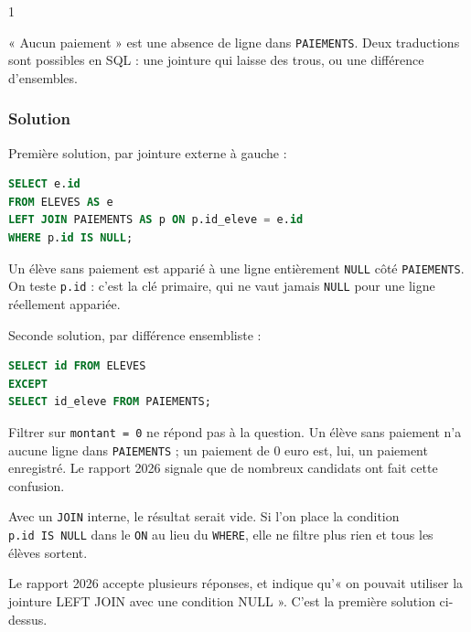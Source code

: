 \documentclass[11pt,a4paper]{article}
\begin{document}
\begin{indication}{1}

« Aucun paiement » est une absence de ligne dans \texttt{PAIEMENTS}. Deux traductions sont possibles en SQL : une jointure qui laisse des trous, ou une différence d'ensembles.

\end{indication}

\hypertarget{solution-3}{%
\subsubsection{Solution}\label{solution-3}}

Première solution, par jointure externe à gauche :

\begin{lstlisting}[language=SQL]
SELECT e.id
FROM ELEVES AS e
LEFT JOIN PAIEMENTS AS p ON p.id_eleve = e.id
WHERE p.id IS NULL;
\end{lstlisting}

Un élève sans paiement est apparié à une ligne entièrement \texttt{NULL} côté \texttt{PAIEMENTS}. On teste \texttt{p.id} : c'est la clé primaire, qui ne vaut jamais \texttt{NULL} pour une ligne réellement appariée.

Seconde solution, par différence ensembliste :

\begin{lstlisting}[language=SQL]
SELECT id FROM ELEVES
EXCEPT
SELECT id_eleve FROM PAIEMENTS;
\end{lstlisting}

\begin{piege}

Filtrer sur \texttt{montant\ =\ 0} ne répond pas à la question. Un élève sans paiement n'a aucune ligne dans \texttt{PAIEMENTS} ; un paiement de 0 euro est, lui, un paiement enregistré. Le rapport 2026 signale que de nombreux candidats ont fait cette confusion.

\end{piege}

\begin{piege}

Avec un \texttt{JOIN} interne, le résultat serait vide. Si l'on place la condition \texttt{p.id\ IS\ NULL} dans le \texttt{ON} au lieu du \texttt{WHERE}, elle ne filtre plus rien et tous les élèves sortent.

\end{piege}

\begin{jury}

Le rapport 2026 accepte plusieurs réponses, et indique qu'« on pouvait utiliser la jointure LEFT JOIN avec une condition NULL ». C'est la première solution ci-dessus.

\end{jury}
\end{document}
